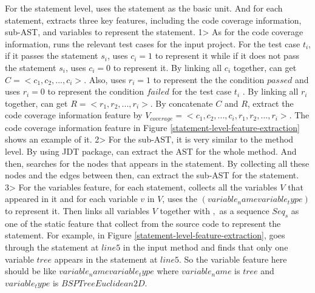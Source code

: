 For the statement level,  \tool uses the statement as the basic unit. And for each statement, \tool extracts three key features, including the code coverage information, sub-AST, and variables to represent the statement. 1> As for the code coverage information, \tool runs the relevant test cases for the input project. For the test case $t_i$, if it passes the statement $s_i$, \tool uses $c_i = 1$ to represent it while if it does not pass the statement $s_i$, \tool uses $c_i = 0$ to represent it. By linking all $c_i$ together, \tool can get $C = <c_1, c_2, ..., c_i>$. Also, \tool uses $r_i = 1$ to represent the the condition $passed$ and uses $r_i = 0$ to represent the condition $failed$ for the test case $t_i$ . By linking all $r_i$ together, \tool can get $R = <r_1, r_2, ..., r_i>$. By concatenate $C$ and $R$, \tool extract the code coverage information feature by $V_{coverage} = <c_1, c_2, ..., c_i, r_1, r_2, ..., r_i>$. The code coverage information feature in Figure \ref{statement-level-feature-extraction} shows an example of it. 2> For the sub-AST, it is very similar to the method level. By using JDT package, \tool can extract the AST for the whole method. And then, \tool searches for the nodes that appears in the statement. By collecting all these nodes and the edges between then, \tool can extract the sub-AST for the statement. 3> For the variables feature, for each statement, \tool collects all the variables $V$ that appeared in it and for each variable $v$ in $V$, \tool uses the $(variable_name variable_type)$ to represent it. Then \tool links all variables $V$ together with $,$ as a sequence $Seq_s$ as one of the static feature that \tool collect from the source code to represent the statement. For example, in Figure \ref{statement-level-feature-extraction}, \tool goes through the statement at $line 5$ in the input method and finds that only one variable $tree$ appears in the statement at $line 5$. So the variable feature here should be like $variable_name variable_type$ where $variable_name$ is $tree$ and $variable_type$ is $BSPTree Euclidean2D$.

